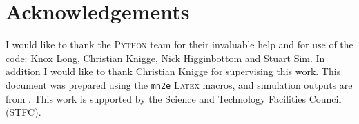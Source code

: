 \documentclass[useAMS,usenatbib,onecolumn]{mn2e2}
\begin{document}
\section*{Acknowledgements}
I would like to thank the \textsc{Python} team for their invaluable help and for use of the code: Knox Long, Christian Knigge, Nick Higginbottom and Stuart Sim. In addition I would like to thank Christian Knigge for supervising this work. This document was prepared using the \texttt{mn2e} \textsc{Latex} macros, and simulation outputs are from . This work is supported by the Science and Technology Facilities Council (STFC).



\newpage
\end{document}
